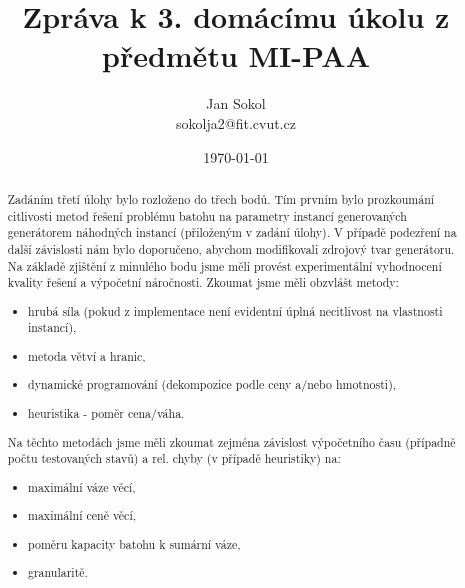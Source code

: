 \documentclass[a4paper,10pt,twocolumn]{article}
\title{Zpráva k 3. domácímu úkolu z předmětu MI-PAA}
\date{\today}
\author{Jan Sokol \\ sokolja2@fit.cvut.cz}
\begin{document}
\maketitle
\begin{abstract}


Zadáním třetí úlohy bylo rozloženo do třech bodů. Tím prvním bylo prozkoumání citlivosti metod řešení problému batohu na parametry instancí generovaných generátorem náhodných instancí (přiloženým v zadání úlohy). V případě podezření na další závislosti nám bylo doporučeno, abychom modifikovali zdrojový tvar generátoru.
Na základě zjištění z minulého bodu jsme měli provést experimentální vyhodnocení kvality řešení a výpočetní náročnosti. 
Zkoumat jsme měli obzvlášt metody:
 \begin{itemize}
\item hrubá síla (pokud z implementace není evidentní úplná necitlivost na vlastnosti instancí),
\item metoda větví a hranic,
\item dynamické programování (dekompozice podle ceny a/nebo hmotnosti),
\item heuristika - poměr cena/váha.
\end{itemize} 

Na těchto metodách jsme měli zkoumat zejména závislost výpočetního času (případně počtu testovaných stavů) a rel. chyby (v případě heuristiky) na:
 \begin{itemize}
\item maximální váze věcí,
\item maximální ceně věcí,
\item poměru kapacity batohu k sumární váze,
\item granularitě.
\end{itemize} 



\end{abstract}
\end{document}

